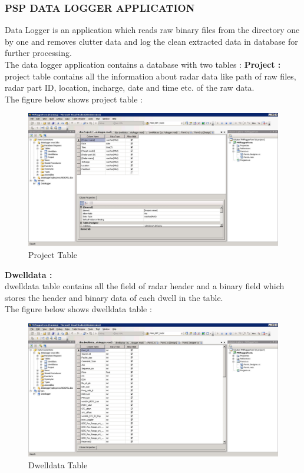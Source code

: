 \documentclass[12pt]{article} %
\begin{document}
\subsubsection{PSP DATA LOGGER APPLICATION}
\noindent Data Logger is an application which reads raw binary files from the directory one by one and removes clutter data and log the clean extracted data in database for further processing.\\
The data logger application contains a database with two tables :
\newline
\noindent \textbf{Project :}\\
project table contains all the information about radar data like path of raw files, radar part ID, location, incharge, date and time etc. of the raw data.\\
The figure below shows project table :
 \begin{figure}[H]
   \includegraphics[width=\linewidth]{Project_table.jpg}
  \caption{Project Table}
  \label{fig:figure 15}
\end{figure}
\noindent \textbf{Dwelldata :}\\
dwelldata table contains all the field of radar header and a binary field which stores the header and binary data of each dwell in the table. \\
The figure below shows dwelldata table :
\begin{figure}[H]
\includegraphics[width=\linewidth]{database_table.jpg}
  \caption{Dwelldata Table}
  \label{fig:figure 16}
\end{figure}
\end{document}
